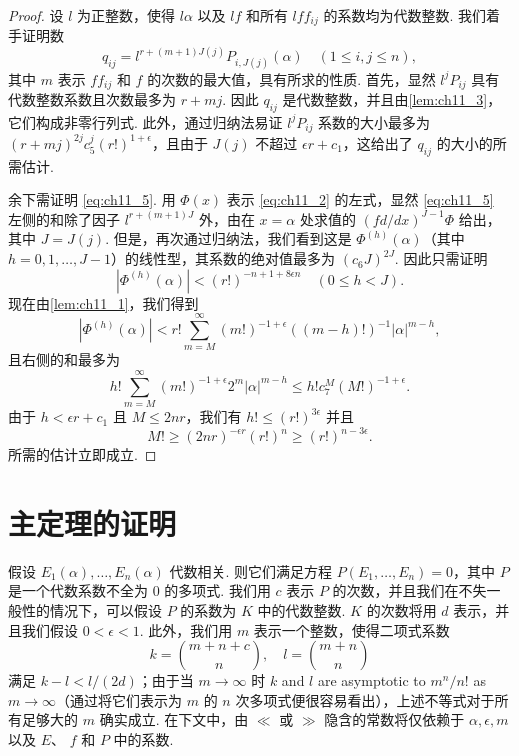 \begin{proof}
设 $l$ 为正整数，使得 $l\alpha$ 以及 $l f$ 和所有 $l f f_{ij}$ 的系数均为代数整数. 我们着手证明数
\[q_{ij} = l^{r+(m+1)J(j)} P_{i, J(j)}(\alpha) \quad (1 \leq i, j \leq n),\]
其中 $m$ 表示 $f f_{ij}$ 和 $f$ 的次数的最大值，具有所求的性质. 首先，显然 $l^j P_{ij}$ 具有代数整数系数且次数最多为 $r+mj$. 因此 $q_{ij}$ 是代数整数，并且由\autoref{lem:ch11_3}，它们构成非零行列式. 此外，通过归纳法易证 $l^j P_{ij}$ 系数的大小最多为 $(r+mj)^{2j} c_5^j (r!)^{1+\epsilon}$，且由于 $J(j)$ 不超过 $\epsilon r+c_1$，这给出了 $q_{ij}$ 的大小的所需估计.

余下需证明 \eqref{eq:ch11_5}. 用 $\Phi(x)$ 表示 \eqref{eq:ch11_2} 的左式，显然 \eqref{eq:ch11_5} 左侧的和除了因子 $l^{r+(m+1)J}$ 外，由在 $x=\alpha$ 处求值的 $(f d/dx)^{J-1}\Phi$ 给出，其中 $J=J(j)$. 但是，再次通过归纳法，我们看到这是 $\Phi^{(h)}(\alpha)$（其中 $h=0,1,\dots,J-1$）的线性型，其系数的绝对值最多为 $(c_6 J)^{2J}$. 因此只需证明
\[|\Phi^{(h)}(\alpha)| < (r!)^{-n+1+8\epsilon n} \quad (0 \le h < J).\]
现在由\autoref{lem:ch11_1}，我们得到
\[|\Phi^{(h)}(\alpha)| < r! \sum_{m=M}^{\infty} (m!)^{-1+\epsilon} ((m-h)!)^{-1} |\alpha|^{m-h},\]
且右侧的和最多为
\[h! \sum_{m=M}^{\infty} (m!)^{-1+\epsilon} 2^m |\alpha|^{m-h} \leqslant h! c_7^M (M!)^{-1+\epsilon}.\]
由于 $h < \epsilon r + c_1$ 且 $M \leq 2nr$，我们有 $h! \leq (r!)^{3\epsilon}$ 并且
\[M! \geqslant (2nr)^{-\epsilon r} (r!)^n \geqslant (r!)^{n-3\epsilon}.\]
所需的估计立即成立.
\end{proof}

\section{主定理的证明}\label{sec:ch11_4}

假设 $E_1(\alpha), \ldots, E_n(\alpha)$ 代数相关. 则它们满足方程 $P(E_1, \ldots, E_n) = 0$，其中 $P$ 是一个代数系数不全为 0 的多项式. 我们用 $c$ 表示 $P$ 的次数，并且我们在不失一般性的情况下，可以假设 $P$ 的系数为 $K$ 中的代数整数. $K$ 的次数将用 $d$ 表示，并且我们假设 $0 < \epsilon < 1$. 此外，我们用 $m$ 表示一个整数，使得二项式系数
\[k = \binom{m+n+c}{n}, \quad l = \binom{m+n}{n}\]
满足 $k - l < l/(2d)$；由于当 $m \to \infty$ 时 $k$ and $l$ are asymptotic to $m^n/n!$ as $m \to \infty$（通过将它们表示为 $m$ 的 $n$ 次多项式便很容易看出），上述不等式对于所有足够大的 $m$ 确实成立. 在下文中，由 $\ll$ 或 $\gg$ 隐含的常数将仅依赖于 $\alpha, \epsilon, m$ 以及 $E$、 $f$ 和 $P$ 中的系数.

